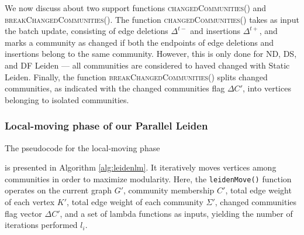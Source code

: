 We now discuss about two support functions \textsc{changedCommunities()} and \textsc{breakChangedCommunities()}. The function \textsc{changedCommunities()} takes as input the batch update, consisting of edge deletions $\Delta^{t-}$ and insertions $\Delta^{t+}$, and marks a community as changed if both the endpoints of edge deletions and insertions belong to the same community. However, this is only done for ND, DS, and DF Leiden --- all communities are considered to haved changed with Static Leiden. Finally, the function \textsc{breakChangedCommunities()} splits changed communities, as indicated with the changed communities flag $\Delta C'$, into vertices belonging to isolated communities.


\subsubsection{Local-moving phase of our Parallel Leiden}

The pseudocode for the local-moving phase is presented in Algorithm \ref{alg:leidenlm}. It iteratively moves vertices among communities in order to maximize modularity. Here, the \texttt{leidenMove()} function operates on the current graph $G'$, community membership $C'$, total edge weight of each vertex $K'$, total edge weight of each community $\Sigma'$, changed communities flag vector $\Delta C'$, and a set of lambda functions as inputs, yielding the number of iterations performed $l_i$.



